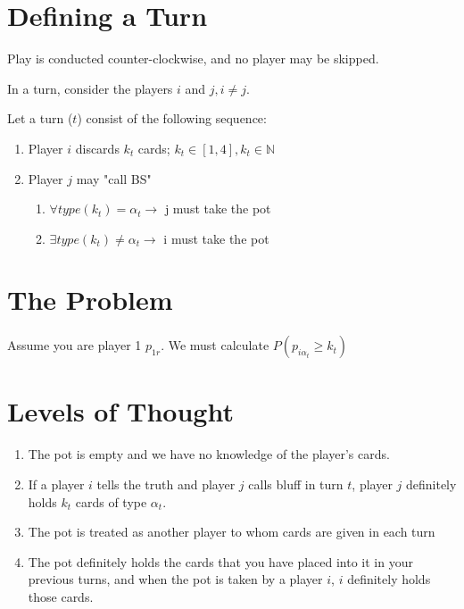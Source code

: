 \documentclass[letterpaper,11pt]{report}
\begin{document}
\begin{description}
    \section{Defining a Turn}
    \item Play is conducted counter-clockwise, and no player may be skipped.
    \item In a turn, consider the players $i$ and $j, i \neq j$.
    \item Let a turn ($t$) consist of the following sequence:
    \begin{enumerate}
        \item Player $i$ discards $k_t$ cards; $k_t \in [1,4], k_t \in \mathbb{N}$
        \item Player $j$ may "call BS"
        \begin{enumerate}
            \item $\forall type(k_t) = \alpha_t \rightarrow$ j must take the pot
            \item $\exists type(k_t) \neq \alpha_t \rightarrow$ i must take the pot
        \end{enumerate}
    \end{enumerate}
    \section{The Problem}
    \paragraph{} Assume you are player 1 $p_{1 r}$. We must calculate $P(p_{i \alpha_t} \geq k_t)$
    \section{Levels of Thought}
    \begin{enumerate}
        \item The pot is empty and we have no knowledge of the player's cards.
        \item If a player $i$ tells the truth and player $j$ calls bluff in turn $t$, player $j$ definitely holds $k_t$ cards of type $\alpha_t$.
        \item The pot is treated as another player to whom cards are given in each turn
        \item The pot definitely holds the cards that you have placed into it in your previous turns, and when the pot is taken by a player $i$, $i$ definitely holds those cards.
    \end{enumerate}
\end{description}
\end{document}
